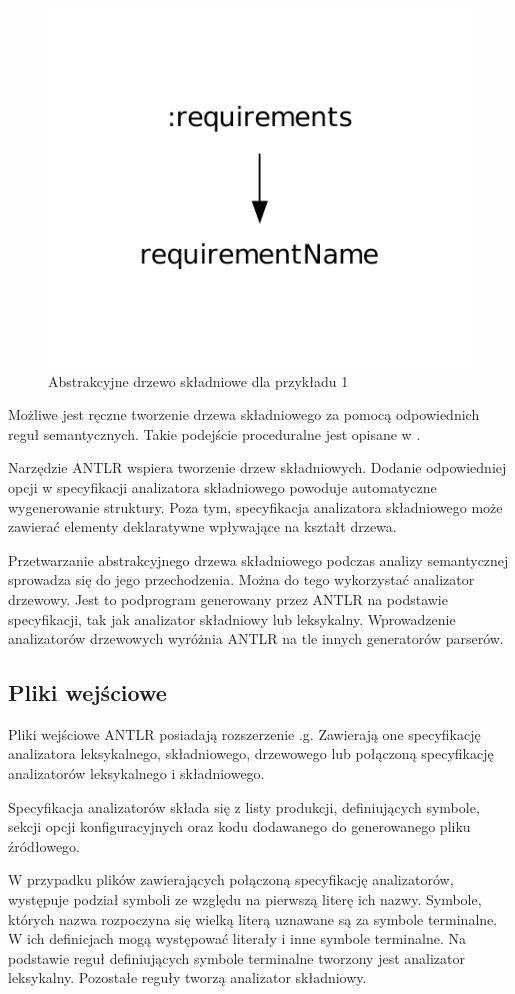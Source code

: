 \begin{figure}[h!]
  \centering
    \includegraphics[scale=0.8]{img/antlr_ast.pdf}
    \caption{Abstrakcyjne drzewo składniowe dla przykładu 1}
    \label{antlr_ast}
\end{figure}


Możliwe jest ręczne tworzenie drzewa składniowego za pomocą odpowiednich
reguł semantycznych. Takie podejście proceduralne jest opisane w \cite{compilers}.

Narzędzie ANTLR wspiera tworzenie drzew składniowych. Dodanie
odpowiedniej opcji w specyfikacji analizatora składniowego powoduje automatyczne
wygenerowanie struktury. Poza tym, specyfikacja analizatora składniowego
 może zawierać elementy deklaratywne wpływające na kształt drzewa.


Przetwarzanie abstrakcyjnego drzewa składniowego podczas analizy semantycznej
sprowadza się do jego przechodzenia. Można do tego wykorzystać analizator drzewowy. 
Jest to podprogram generowany przez
ANTLR na podstawie specyfikacji, tak jak analizator składniowy lub leksykalny.
Wprowadzenie analizatorów drzewowych wyróżnia ANTLR na tle innych generatorów
 parserów. 

\subsection{Pliki wejściowe}

Pliki wejściowe ANTLR posiadają rozszerzenie .g. Zawierają one specyfikację
analizatora leksykalnego, składniowego, drzewowego lub połączoną specyfikację
analizatorów leksykalnego i składniowego. 

Specyfikacja analizatorów składa się z listy produkcji, definiujących symbole,
 sekcji opcji konfiguracyjnych oraz kodu dodawanego do generowanego
pliku źródłowego.

W przypadku plików zawierających połączoną specyfikację analizatorów, występuje
podział symboli ze względu na pierwszą literę ich nazwy.
 Symbole, których nazwa rozpoczyna się wielką literą uznawane są
za symbole terminalne. W ich definicjach mogą występować literały i inne
symbole terminalne. Na podstawie reguł definiujących symbole terminalne
tworzony jest analizator leksykalny. Pozostałe reguły tworzą analizator
składniowy.

